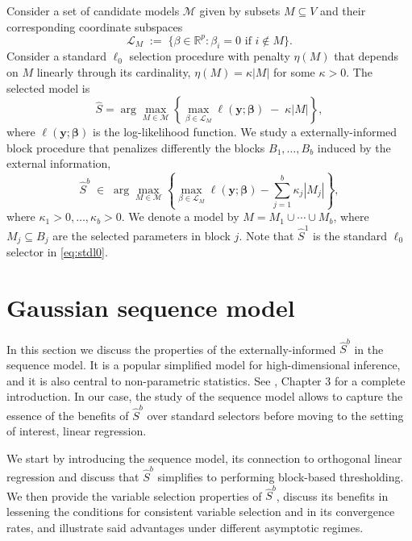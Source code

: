 \documentclass[bj,authoryear]{imsart}
\theoremstyle{plain}
\newcommand{\david}[1]{{\small{\color{blue} \sf $\heartsuit$ [David: #1]}}}
\newcommand{\paul}[1]{{\small{\color{green} \sf $\spadesuit$ Paul: #1}}}
\newcommand{\R}{\mathbb{R}}
\newcommand{\M}{\mathcal{M}}
\newcommand{\bs}{\boldsymbol}
\begin{document}
Consider a set of candidate models $\M$ given by subsets $M\subseteq V$ and their corresponding coordinate subspaces 
$$
\mathcal{L}_M\;:=\;\{\beta\in \R^p: \beta_i=0\mbox{ if }i\notin M\}.
$$
Consider a standard $\ell_0$ selection procedure with penalty $\eta(M)$ that depends on $M$ linearly through its cardinality, $\eta(M)=\kappa |M|$ for some $\kappa>0$. The selected model is
\begin{equation}\label{eq:stdl0}
\hat{S}= \arg\max_{M\in \M} \left\{\max_{\beta\in \mathcal{L}_M}\ell(\bs y; \bs \beta)\;-\;\kappa |M|\right\},
\end{equation}
where $\ell(\bs y; \bs \beta)$ is the log-likelihood function. 
We study a externally-informed block procedure that penalizes differently the blocks $B_1,\ldots,B_b$ induced by the external information,
\begin{equation}\label{eq:Mhat}
  \hat S^b\;\in\;\arg\max_{M\in \M} \left\{\max_{\beta\in \mathcal{L}_M}\ell(\bs y; \bs \beta)-\sum_{j=1}^b\kappa_j |M_j| \right\},
\end{equation}
where $\kappa_1>0,\ldots,\kappa_b>0$. We denote a model by $M=M_1\cup\cdots\cup M_b$,
where $M_j \subseteq B_j$ are %
the selected parameters in block $j$.
Note that $\hat{S}^1$ is the standard $\ell_0$ selector in \eqref{eq:stdl0}.

\section{Gaussian sequence model}\label{sec:properties_orth}

In this section we discuss the properties of the externally-informed $\hat S^b$ in the sequence model. It is a popular simplified model for high-dimensional inference, and it is also central to non-parametric statistics. See \cite{johnstone}, Chapter 3 for a complete introduction. In our case, the study of the sequence model allows to capture the essence of the benefits of $\hat S^b$ over standard selectors before moving to the setting of interest, linear regression.

We start by introducing the sequence model, its connection to orthogonal linear regression and discuss that $\hat S^b$ simplifies to performing block-based thresholding. %
We then provide the variable selection properties of $\hat S^b$, discuss its benefits in lessening the conditions for consistent variable selection and in its convergence rates, and illustrate said advantages under different asymptotic regimes.
\end{document}
